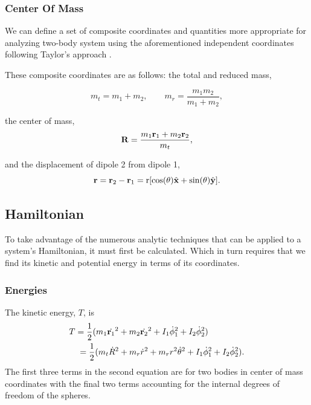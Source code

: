 \documentclass[prbg,preprint]{revtex4-1}
\newcommand{\cvec}[1]{{\rm{\bf{#1}}}}
\begin{document}
\subsubsection{Center Of Mass}
We can define a set of composite coordinates and quantities more appropriate for analyzing two-body system using the aforementioned independent coordinates following Taylor's approach \cite{taylor2005classical}. 

These composite coordinates are as follows: the total and reduced mass,

\begin{equation}
m_t = m_1+m_2,
\qquad
m_r = \frac{m_1m_2}{m_1+m_2},
\end{equation}

the center of mass,
\begin{equation}
\cvec{R} = \frac{m_1 \cvec{r}_1+m_2 \cvec{r}_2}{m_t},
\end{equation}

and the displacement of dipole 2 from dipole 1,
\begin{equation}
\cvec{r}
=  \cvec r_2-\cvec r_1 
= \textrm{r} [\cos(\theta) \hat {\cvec x}+\sin(\theta) \hat {\cvec y}].
\end{equation}


\subsection{Hamiltonian}
To take advantage of the numerous analytic techniques that can be applied to a system's Hamiltonian, it must first be calculated. Which in turn requires that we find its kinetic and potential energy in terms of its coordinates.
\subsubsection{Energies}
The kinetic energy, $T$, is \cite{taylor2005classical}
\begin{equation}
	\begin{multlined}
            T = 
            \frac{1}{2}(
            	m_1 \dot {\cvec{r}_1}^2
            	+m_2 \dot {\cvec{r}_2}^2
            	+ I_1 \dot \phi_1^2
            	+ I_2 \dot \phi_2^2
            )
            \\
            =\frac{1}{2}(
            	m_t \dot R^2
            	+m_r \dot r^2
            	+m_r r^2 \dot \theta^2
            	+ I_1 \dot \phi_1^2
            	+ I_2 \dot \phi_2^2
).
  \end{multlined}
\end{equation}
The first three terms in the second equation are for two bodies in center of mass coordinates with the final two terms accounting for the internal degrees of freedom of the spheres. 
\end{document}
